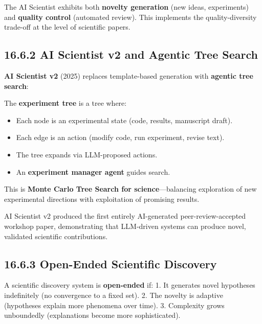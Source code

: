 \begin{observation}
The AI Scientist exhibits both \textbf{novelty generation} (new ideas, experiments) and \textbf{quality control} (automated review). This implements the quality-diversity trade-off at the level of scientific papers.
\end{observation}

\subsection{16.6.2 AI Scientist v2 and Agentic Tree Search}

\textbf{AI Scientist v2} (2025) replaces template-based generation with \textbf{agentic tree search}:

\begin{definition}
The \textbf{experiment tree} is a tree where:
\begin{itemize}
\item Each node is an experimental state (code, results, manuscript draft).
\item Each edge is an action (modify code, run experiment, revise text).
\item The tree expands via LLM-proposed actions.
\item An \textbf{experiment manager agent} guides search.

\end{itemize}
This is \textbf{Monte Carlo Tree Search for science}---balancing exploration of new experimental directions with exploitation of promising results.
\end{definition}

\begin{theorem}
AI Scientist v2 produced the first entirely AI-generated peer-review-accepted workshop paper, demonstrating that LLM-driven systems can produce novel, validated scientific contributions.
\end{theorem}

\subsection{16.6.3 Open-Ended Scientific Discovery}

\begin{definition}
A scientific discovery system is \textbf{open-ended} if:
1. It generates novel hypotheses indefinitely (no convergence to a fixed set).
2. The novelty is adaptive (hypotheses explain more phenomena over time).
3. Complexity grows unboundedly (explanations become more sophisticated).
\end{definition}

